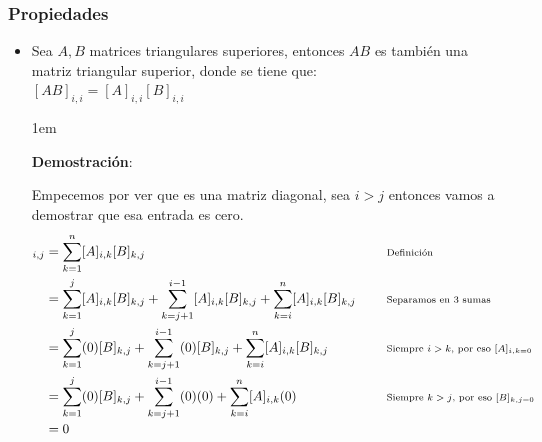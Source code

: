 \documentclass[12pt, fleqn]{report}                             %
\newenvironment{SmallIndentation}[1][0.75em]                    %
        {\begin{adjustwidth}{#1}{}\begin{footnotesize}}             %
        {\end{footnotesize}\end{adjustwidth}}                       %
\DeclareMathOperator \Space {\quad}                             %
\newcommand \Remember[1]{\Space\text{\scriptsize{#1}}}          %
\theoremstyle{break}                                            %
\begin{document}
                \clearpage
                \subsubsection{Propiedades}

                    \begin{itemize}
                        
                        \item 
                            Sea $A, B$ matrices triangulares superiores, entonces $AB$ es también
                            una matriz triangular superior, donde se tiene que:\\
                            $[AB]_{i, i} = [A]_{i, i} [B]_{i, i}$

                            \begin{SmallIndentation}[1em]
                                \textbf{Demostración}:
                                
                                Empecemos por ver que es una matriz diagonal, sea $i > j$ entonces
                                vamos a demostrar que esa entrada es cero.
                                \begin{align*}
                                    [AB]_{i, j} 
                                        &= \sum_{k = 1}^n [A]_{i, k} [B]_{k, j} 
                                            && \Remember{Definición}                                \\
                                        &= 
                                              \sum_{k = 1}^j        [A]_{i, k} [B]_{k, j}
                                            + \sum_{k = j+1}^{i - 1}[A]_{i, k} [B]_{k, j} 
                                            + \sum_{k = i}^n        [A]_{i, k} [B]_{k, j}   
                                            && \Remember{Separamos en 3 sumas}                      \\
                                        &= 
                                              \sum_{k = 1}^j        (0) [B]_{k, j}
                                            + \sum_{k = j+1}^{i - 1}(0) [B]_{k, j} 
                                            + \sum_{k = i}^n        [A]_{i, k} [B]_{k, j}   
                                            && \Remember{Siempre $i > k$, por eso $[A]_{i, k = 0}$} \\
                                        &= 
                                              \sum_{k = 1}^j        (0) [B]_{k, j}
                                            + \sum_{k = j+1}^{i - 1}(0)(0)
                                            + \sum_{k = i}^n        [A]_{i, k} (0)          
                                            && \Remember{Siempre $k > j$, por eso $[B]_{k, j = 0}$} \\
                                        &= 0 
                                \end{align*}


\end{SmallIndentation}
\end{itemize}
\end{document}
